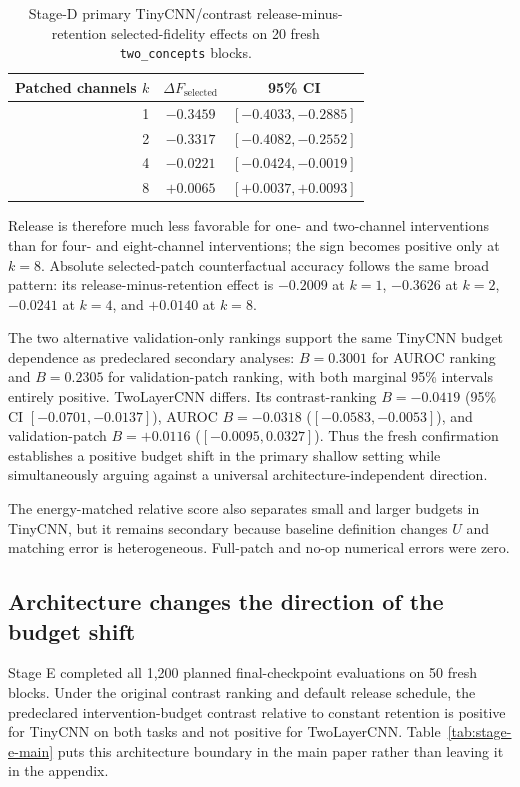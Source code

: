 \documentclass[10pt]{article}
\begin{document}
\begin{table}[t]
\centering
\small
\begin{tabular}{rcc}
\toprule
Patched channels $k$ & $\Delta F_{\mathrm{selected}}$ & 95\% CI \\
\midrule
1 & $-0.3459$ & $[-0.4033,-0.2885]$ \\
2 & $-0.3317$ & $[-0.4082,-0.2552]$ \\
4 & $-0.0221$ & $[-0.0424,-0.0019]$ \\
8 & $+0.0065$ & $[+0.0037,+0.0093]$ \\
\bottomrule
\end{tabular}
\caption{Stage-D primary TinyCNN/contrast release-minus-retention selected-fidelity effects on 20 fresh \texttt{two\_concepts} blocks.}
\label{tab:primary-curve}
\end{table}

Release is therefore much less favorable for one- and two-channel interventions than for four- and eight-channel interventions; the sign becomes positive only at $k=8$. Absolute selected-patch counterfactual accuracy follows the same broad pattern: its release-minus-retention effect is $-0.2009$ at $k=1$, $-0.3626$ at $k=2$, $-0.0241$ at $k=4$, and $+0.0140$ at $k=8$.

The two alternative validation-only rankings support the same TinyCNN budget dependence as predeclared secondary analyses: $B=0.3001$ for AUROC ranking and $B=0.2305$ for validation-patch ranking, with both marginal 95\% intervals entirely positive. TwoLayerCNN differs. Its contrast-ranking $B=-0.0419$ (95\% CI $[-0.0701,-0.0137]$), AUROC $B=-0.0318$ ($[-0.0583,-0.0053]$), and validation-patch $B=+0.0116$ ($[-0.0095,0.0327]$). Thus the fresh confirmation establishes a positive budget shift in the primary shallow setting while simultaneously arguing against a universal architecture-independent direction.

The energy-matched relative score also separates small and larger budgets in TinyCNN, but it remains secondary because baseline definition changes $U$ and matching error is heterogeneous. Full-patch and no-op numerical errors were zero.

\subsection{Architecture changes the direction of the budget shift}\label{sec:exhaustive}

Stage E completed all 1,200 planned final-checkpoint evaluations on 50 fresh blocks. Under the original contrast ranking and default release schedule, the predeclared intervention-budget contrast relative to constant retention is positive for TinyCNN on both tasks and not positive for TwoLayerCNN. Table~\ref{tab:stage-e-main} puts this architecture boundary in the main paper rather than leaving it in the appendix.
\end{document}
